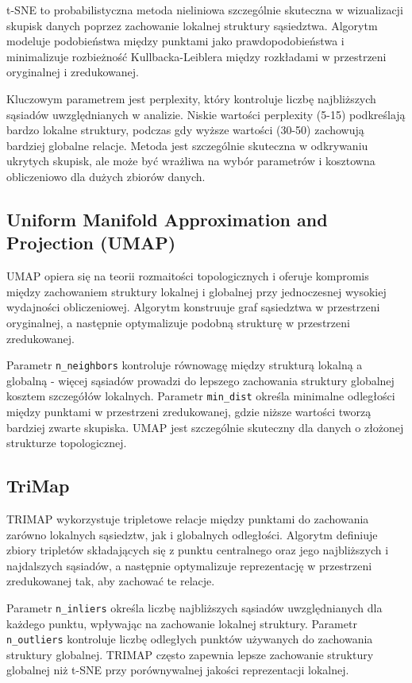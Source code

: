 \documentclass[a4paper, 12pt]{article}
\begin{document}
t-SNE to probabilistyczna metoda nieliniowa szczególnie skuteczna w wizualizacji skupisk danych poprzez zachowanie lokalnej struktury sąsiedztwa. Algorytm modeluje podobieństwa między punktami jako prawdopodobieństwa i minimalizuje rozbieżność Kullbacka-Leiblera między rozkładami w przestrzeni oryginalnej i zredukowanej.

Kluczowym parametrem jest perplexity, który kontroluje liczbę najbliższych sąsiadów uwzględnianych w analizie. Niskie wartości perplexity (5-15) podkreślają bardzo lokalne struktury, podczas gdy wyższe wartości (30-50) zachowują bardziej globalne relacje. Metoda jest szczególnie skuteczna w odkrywaniu ukrytych skupisk, ale może być wrażliwa na wybór parametrów i kosztowna obliczeniowo dla dużych zbiorów danych.

\subsection{Uniform Manifold Approximation and Projection (UMAP)}

UMAP opiera się na teorii rozmaitości topologicznych i oferuje kompromis między zachowaniem struktury lokalnej i globalnej przy jednoczesnej wysokiej wydajności obliczeniowej. Algorytm konstruuje graf sąsiedztwa w przestrzeni oryginalnej, a następnie optymalizuje podobną strukturę w przestrzeni zredukowanej.

Parametr \texttt{n\_neighbors} kontroluje równowagę między strukturą lokalną a globalną - więcej sąsiadów prowadzi do lepszego zachowania struktury globalnej kosztem szczegółów lokalnych. Parametr \texttt{min\_dist} określa minimalne odległości między punktami w przestrzeni zredukowanej, gdzie niższe wartości tworzą bardziej zwarte skupiska. UMAP jest szczególnie skuteczny dla danych o złożonej strukturze topologicznej.

\subsection{TriMap}

TRIMAP wykorzystuje tripletowe relacje między punktami do zachowania zarówno lokalnych sąsiedztw, jak i globalnych odległości. Algorytm definiuje zbiory tripletów składających się z punktu centralnego oraz jego najbliższych i najdalszych sąsiadów, a następnie optymalizuje reprezentację w przestrzeni zredukowanej tak, aby zachować te relacje.

Parametr \texttt{n\_inliers} określa liczbę najbliższych sąsiadów uwzględnianych dla każdego punktu, wpływając na zachowanie lokalnej struktury. Parametr \texttt{n\_outliers} kontroluje liczbę odległych punktów używanych do zachowania struktury globalnej. TRIMAP często zapewnia lepsze zachowanie struktury globalnej niż t-SNE przy porównywalnej jakości reprezentacji lokalnej.
\end{document}
